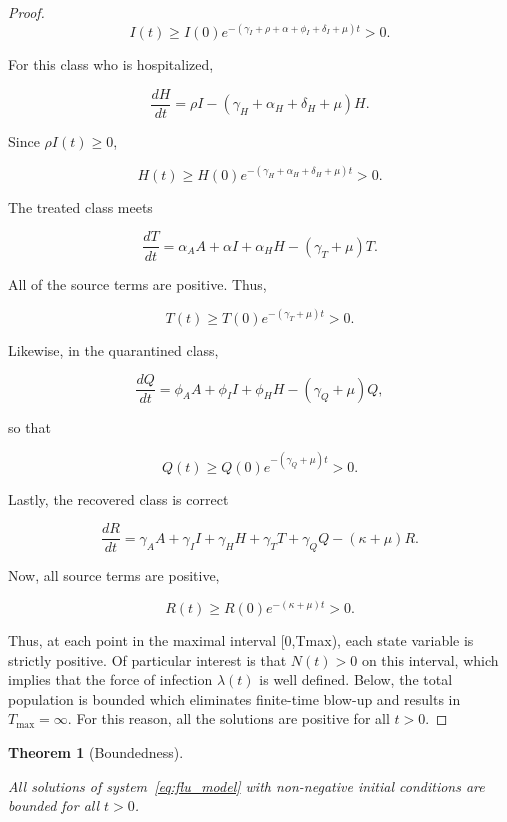 \documentclass[12pt,a4paper]{article}
\newtheorem{theorem}{Theorem}[section]
\theoremstyle{definition}
\theoremstyle{remark}
\begin{document}
\begin{proof}
$$
I(t)\geq
I(0)
e^{-(\gamma_I+\rho+\alpha+\phi_I+\delta_I+\mu)t}>0.
$$

For this class who is hospitalized,

$$
\frac{dH}{dt}
=
\rho I
-
(\gamma_H+\alpha_H+\delta_H+\mu)H.
$$

Since $\rho I(t)\geq0$,

$$
H(t)\geq
H(0)
e^{-(\gamma_H+\alpha_H+\delta_H+\mu)t}>0.
$$

The treated class meets

$$
\frac{dT}{dt}
=
\alpha_AA+\alpha I+\alpha_HH-(\gamma_T+\mu)T.
$$

All of the source terms are positive. Thus,

$$
T(t)\geq T(0)e^{-(\gamma_T+\mu)t}>0.
$$

Likewise, in the quarantined class,

$$
\frac{dQ}{dt}
=
\phi_AA+\phi_I I+\phi_HH-(\gamma_Q+\mu)Q,
$$

so that

$$
Q(t)\geq Q(0)e^{-(\gamma_Q+\mu)t}>0.
$$

Lastly, the recovered class is correct

$$
\frac{dR}{dt}
=
\gamma_AA+\gamma_I I+\gamma_HH+\gamma_TT+\gamma_QQ
-(\kappa+\mu)R.
$$

Now, all source terms are positive,

$$
R(t)\geq R(0)e^{-(\kappa+\mu)t}>0.
$$

Thus, at each point in the maximal interval [0,Tmax), each state variable is strictly positive. Of particular interest is that $N(t) > 0$ on this interval, which implies that the force of infection $\lambda(t)$ is well defined. Below, the total population is bounded which eliminates finite-time blow-up and results in $T_{\max}=\infty$. For this reason, all the solutions are positive for all $t>0$.

\end{proof}

\begin{theorem}[Boundedness]
\label{thm:influenza_boundedness}

All solutions of system~\eqref{eq:flu_model} with non-negative initial conditions are bounded for all $t>0$.

\end{theorem}
\end{document}
